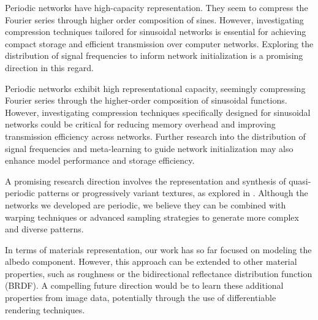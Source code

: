 Periodic networks have high-capacity representation. They seem to compress the Fourier series through higher order composition of sines. However, investigating compression techniques tailored for sinusoidal networks is essential for achieving compact storage and efficient transmission over computer networks. Exploring the distribution of signal frequencies to inform network initialization is a promising direction in this regard.

Periodic networks exhibit high representational capacity, seemingly compressing Fourier series through the higher-order composition of sinusoidal functions. However, investigating compression techniques specifically designed for sinusoidal networks could be critical for reducing memory overhead and improving transmission efficiency across networks. Further research into the distribution of signal frequencies and meta-learning to guide network initialization may also enhance model performance and storage efficiency.

A promising research direction involves the representation and synthesis of quasi-periodic patterns \red{[CITE]} or progressively variant textures, as explored in \cite{variantTextures}. Although the networks we developed are periodic, we believe they can be combined with warping techniques or advanced sampling strategies to generate more complex and diverse patterns.

In terms of materials representation, our work has so far focused on modeling the albedo component. However, this approach can be extended to other material properties, such as roughness or the bidirectional reflectance distribution function (BRDF). A compelling future direction would be to learn these additional properties from image data, potentially through the use of differentiable rendering techniques.





